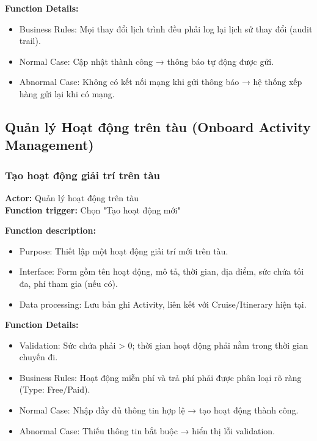 \textbf{Function Details:}
\begin{itemize}
    \item Business Rules: Mọi thay đổi lịch trình đều phải log lại lịch
    sử thay đổi (audit trail).
    \item Normal Case: Cập nhật thành công → thông báo tự động được gửi.
    \item Abnormal Case: Không có kết nối mạng khi gửi thông báo → hệ
    thống xếp hàng gửi lại khi có mạng.
\end{itemize}

\subsection{Quản lý Hoạt động trên tàu (Onboard Activity Management)}

\subsubsection{Tạo hoạt động giải trí trên tàu}
\textbf{Actor:} Quản lý hoạt động trên tàu \\
\textbf{Function trigger:} Chọn "Tạo hoạt động mới"

\textbf{Function description:}
\begin{itemize}
    \item Purpose: Thiết lập một hoạt động giải trí mới trên tàu.
    \item Interface: Form gồm tên hoạt động, mô tả, thời gian, địa điểm,
    sức chứa tối đa, phí tham gia (nếu có).
    \item Data processing: Lưu bản ghi Activity, liên kết với
    Cruise/Itinerary hiện tại.
\end{itemize}

\textbf{Function Details:}
\begin{itemize}
    \item Validation: Sức chứa phải > 0; thời gian hoạt động phải nằm
    trong thời gian chuyến đi.
    \item Business Rules: Hoạt động miễn phí và trả phí phải được phân
    loại rõ ràng (Type: Free/Paid).
    \item Normal Case: Nhập đầy đủ thông tin hợp lệ → tạo hoạt động thành
    công.
    \item Abnormal Case: Thiếu thông tin bắt buộc → hiển thị lỗi
    validation.
\end{itemize}



